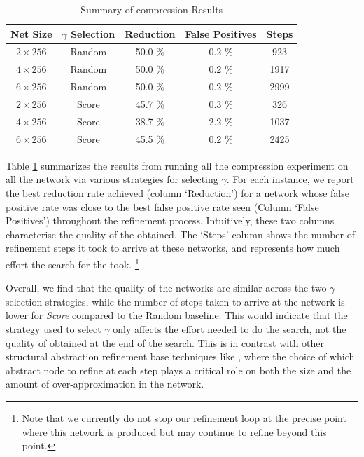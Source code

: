 \begin{table}
\begin{tabular}{|c|c|c|c|c|}
\hline
Net Size     & $\gamma$ Selection & Reduction & False Positives & Steps  \\ 
\hline
$2\times256$ & Random             & 50.0 \%   & 0.2  \%         &  923   \\  
$4\times256$ & Random             & 50.0 \%   & 0.2  \%         & 1917    \\ 
$6\times256$ & Random             & 50.0 \%   & 0.2  \%         & 2999    \\ 
$2\times256$ & Score      & 45.7 \%   & 0.3  \%         &  326    \\ 
$4\times256$ & Score      & 38.7 \%   & 2.2  \%         & 1037    \\ 
$6\times256$ & Score      & 45.5 \%   & 0.2  \%         & 2425    \\ 
\hline
\end{tabular}
\caption{Summary of \mnist compression Results}
\label{t:mnist-compr-summary}
\end{table}

Table \ref{t:mnist-compr-summary} summarizes the results from running all the
compression experiment on all the \mnist network via various strategies for
selecting $\gamma$. For each instance, we report the best reduction
rate achieved (column `Reduction') for a network whose false positive rate was
close to the best false positive rate seen (Column `False Positives')
throughout the refinement process. Intuitively, these two columns characterise
the quality of the \abs obtained. The `Steps' column shows the
number of refinement steps it took to arrive at these networks, and represents
how much effort the search for the \abs took. \footnote{ Note that we currently do
not stop our refinement loop at the precise point where this network is produced
but may continue to refine beyond this point. }

Overall, we find that the quality of the networks are similar across the two
$\gamma$ selection strategies, while the number of steps
taken to arrive at the network is lower for \emph{Score} compared to the Random
baseline. This would indicate that the strategy used to select $\gamma$ only
affects the effort needed to do the search, not the quality of \abs obtained at
the end of the search. This is in contrast with other structural abstraction
refinement base techniques like \cite{cegar-nn,cegarette,cleverest-nn}, where
the choice of which abstract node to refine at each step plays a critical role
on both the size and the amount of over-approximation in the network. 

